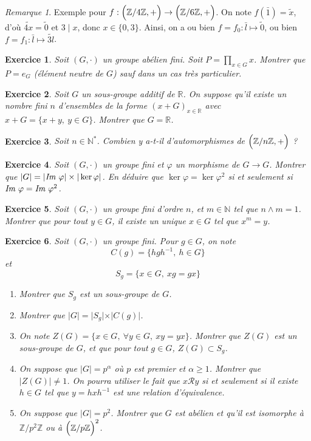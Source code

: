 \documentclass[12pt]{article}
\newtheorem{exercise}{Exercice}[section]
\theoremstyle{remark}
\theoremstyle{remark}
\newtheorem{remark}{Remarque}
\newcommand{\R}{\mathbb{R}}
\newcommand{\N}{\mathbb{N}}
\newcommand{\Z}{\mathbb{Z}}
\newcommand{\im}{\emph{Im }}
\begin{document}
\begin{remark}
	Exemple pour $f:\Bigl(\Z/4\Z, +\Bigr)\to\Bigl(\Z/6\Z, +\Bigr)$. On note
	$f(\bar{1})=\tilde{x}$, d'où $\tilde{4x}=\tilde{0}$ et $3\mid x$, donc
	$x\in\{0,3\}$. Ainsi, on a ou bien $f=f_{0}:\bar{l}\mapsto \tilde{0}$, ou
	bien $f=f_{1}:\bar{l}\mapsto \tilde{3l}$.
\end{remark}

\begin{exercise}
	Soit $(G,\cdot)$ un groupe abélien fini. Soit $P=\prod_{x\in G}x$. Montrer
	que $P=e_{G}$ (élément neutre de $G$) sauf dans un cas très particulier.
\end{exercise}

\begin{exercise}
	Soit $G$ un sous-groupe additif de $\R$. On suppose qu'il existe un nombre
	fini $n$ d'ensembles de la forme $(x+G)_{x\in\R}$ avec $x+G=\{x+y,~y\in G\}$. Montrer que $G=\R$.
\end{exercise}

\begin{exercise}
	Soit $n\in\N^*$. Combien y a-t-il d'automorphismes de $\Bigl(\Z/n\Z,
	+\Bigr)$ ?
\end{exercise}

\begin{exercise}
	Soit $(G,\cdot)$ un groupe fini et $\varphi$ un morphisme de $G\to G$.
	Montrer que $\vert G\vert=\vert\im\varphi\vert\times\vert\ker\varphi\vert$.
	En déduire que $\ker\varphi=\ker\varphi^2$ si et seulement si
	$\im\varphi=\im\varphi^2$. 
\end{exercise}

\begin{exercise}
	Soit $(G,\cdot)$ un groupe fini d'ordre $n$, et $m\in\N$ tel que $n\wedge m=1$.
	Montrer que pour tout $y\in G$, il existe un unique $x\in G$ tel que $x^m=y$.
\end{exercise}

\begin{exercise}
	Soit $(G,\cdot)$ un groupe fini. Pour $g\in G$, on note 
	$$C(g)=\{hgh^{-1},~h\in G\}$$
	et 
	$$S_{g}=\{x\in G,~xg=gx\}$$
	\begin{enumerate}
		\item Montrer que $S_{g}$ est un sous-groupe de $G$.
		\item Montrer que $\vert G\vert=\vert S_{g}\vert\times\vert C(g)\vert$.
		\item On note $Z(G)=\{x\in G,~\forall y\in G,~xy=yx\}$. Montrer que
		$Z(G)$ est un sous-groupe de $G$, et que pour tout $g\in G$,
		$Z(G)\subset S_{g}$.
		\item On suppose que $\vert G\vert=p^{\alpha}$ où $p$ est premier et
		$\alpha\geqslant1$. Montrer que $\vert Z(G)\vert\neq1$. On pourra
		utiliser le fait que $x\mathcal{R}y$ si et seulement si il existe $h\in
		G$ tel que $y=hxh^{-1}$ est une relation d'équivalence.
		\item On suppose que $\vert G\vert=p^{2}$. Montrer que $G$ est abélien
		et qu'il est isomorphe à $\Z/p^2\Z$ ou à $\Bigl(\Z/p\Z\Bigr)^2$.
	\end{enumerate}
\end{exercise}
\end{document}
